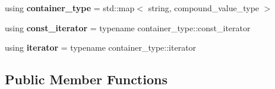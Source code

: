 \begin{DoxyCompactItemize}
using {\bfseries container\+\_\+type} = std\+::map$<$ string, compound\+\_\+value\+\_\+type $>$
\item 
\mbox{\label{classouchi_1_1program__options_1_1basic__options__description_a8939009ecb6ae06cf19286fbeef61363}} 
using {\bfseries const\+\_\+iterator} = typename container\+\_\+type\+::const\+\_\+iterator
\item 
\mbox{\label{classouchi_1_1program__options_1_1basic__options__description_af57391ea514901b6540a1256b9edffe8}} 
using {\bfseries iterator} = typename container\+\_\+type\+::iterator
\end{DoxyCompactItemize}
\subsection*{Public Member Functions}
